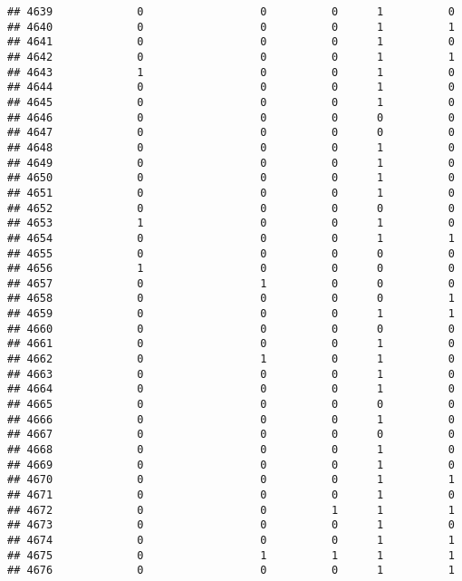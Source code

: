 \documentclass[
]{article}
\begin{document}
\begin{verbatim}
## 4639             0                  0          0      1          0
## 4640             0                  0          0      1          1
## 4641             0                  0          0      1          0
## 4642             0                  0          0      1          1
## 4643             1                  0          0      1          0
## 4644             0                  0          0      1          0
## 4645             0                  0          0      1          0
## 4646             0                  0          0      0          0
## 4647             0                  0          0      0          0
## 4648             0                  0          0      1          0
## 4649             0                  0          0      1          0
## 4650             0                  0          0      1          0
## 4651             0                  0          0      1          0
## 4652             0                  0          0      0          0
## 4653             1                  0          0      1          0
## 4654             0                  0          0      1          1
## 4655             0                  0          0      0          0
## 4656             1                  0          0      0          0
## 4657             0                  1          0      0          0
## 4658             0                  0          0      0          1
## 4659             0                  0          0      1          1
## 4660             0                  0          0      0          0
## 4661             0                  0          0      1          0
## 4662             0                  1          0      1          0
## 4663             0                  0          0      1          0
## 4664             0                  0          0      1          0
## 4665             0                  0          0      0          0
## 4666             0                  0          0      1          0
## 4667             0                  0          0      0          0
## 4668             0                  0          0      1          0
## 4669             0                  0          0      1          0
## 4670             0                  0          0      1          1
## 4671             0                  0          0      1          0
## 4672             0                  0          1      1          1
## 4673             0                  0          0      1          0
## 4674             0                  0          0      1          1
## 4675             0                  1          1      1          1
## 4676             0                  0          0      1          1

\end{verbatim}
\end{document}
